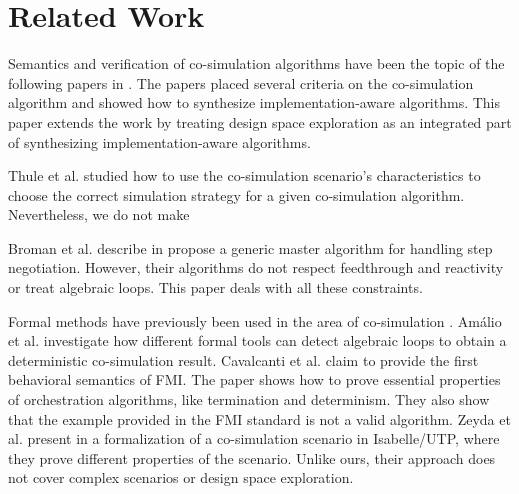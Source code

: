 \section{Related Work}\label{sc:related}
Semantics and verification of co-simulation algorithms have been the topic of the following papers in \cite{Gomes2019c,Gomes2019a,Broman2013,thrane2021}. 
The papers \cite{Gomes2019c,thrane2021} placed several criteria on the co-simulation algorithm and showed how to synthesize implementation-aware algorithms.
This paper extends the work by treating design space exploration as an integrated part of synthesizing implementation-aware algorithms. 

Thule et al. \cite{Thule_2018} studied how to use the co-simulation scenario's characteristics to choose the correct simulation strategy for a given co-simulation algorithm. 
Nevertheless, we do not make 

Broman et al. describe in \cite{Broman2013} propose a generic master algorithm for handling step negotiation. 
However, their algorithms do not respect feedthrough and reactivity or treat algebraic loops. 
This paper deals with all these constraints.

Formal methods have previously been used in the area of co-simulation \cite{Amalio2016,sampaio_behavioural_2016,cerone_formalising_2018,hansen_verification_2021}.
Amálio et al. \cite{Amalio2016} investigate how different formal tools can detect algebraic loops to obtain a deterministic co-simulation result. 
Cavalcanti et al. \cite{sampaio_behavioural_2016} claim to provide the first behavioral semantics of FMI. 
The paper shows how to prove essential properties of orchestration algorithms, like termination and determinism. 
They also show that the example provided in the FMI standard is not a valid algorithm. 
Zeyda et al. present in \cite{cerone_formalising_2018}  a formalization of a co-simulation scenario in Isabelle/UTP, where they prove different properties of the scenario.
Unlike ours, their approach does not cover complex scenarios or design space exploration.